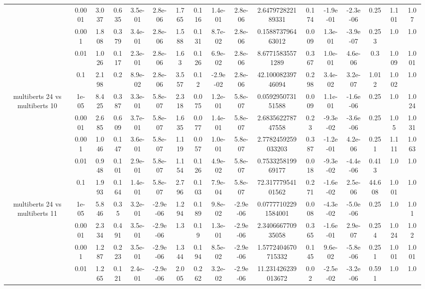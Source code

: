\begin{tabular}{|c|c|c|c|c|c|c|c|c|c|c|c|c|c|c|c|c|}
 & 0.0001 & 3.037 & 0.635 & 3.5e-01 & 2.8e-06 & 1.765 & 0.116 & 1.4e-01 & 2.8e-06 & 2.647972822189331 & 0.174 & -1.9e-01 & -2.3e-06 & 0.25 & 1.101 & 1.07 \\
 & 0.001 & 1.808 & 0.379 & 3.4e-01 & 2.8e-06 & 1.588 & 0.131 & 8.7e-02 & 2.8e-06 & 0.158873796463012 & 0.009 & 1.3e-01 & -3.9e-07 & 0.253 & 1.0 & 1.0 \\
 & 0.01 & 1.026 & 0.117 & 2.3e-01 & 2.8e-06 & 1.63 & 0.126 & 6.9e-02 & 2.8e-06 & 8.67715835571289 & 0.367 & 1.0e-01 & 4.6e-06 & 0.3 & 1.009 & 1.001 \\
 & 0.1 & 2.198 & 0.2 & 8.9e-02 & 2.8e-06 & 3.557 & 0.12 & -2.9e-02 & 2.8e-06 & 42.10008239746094 & 0.298 & 3.4e-02 & 3.2e-07 & 1.012 & 1.002 & 1.0 \\
\hline
\multirow{5}{*}{multiberts 24 vs multiberts 10} & 1e-05 & 8.425 & 0.387 & 3.3e-01 & 5.8e-07 & 2.318 & 0.075 & 1.2e-01 & 5.8e-07 & 0.059295073151588 & 0.009 & 1.1e-01 & -1.6e-06 & 0.25 & 1.0 & 1.024 \\
 & 0.0001 & 2.685 & 0.609 & 3.7e-01 & 5.8e-07 & 1.635 & 0.077 & 1.4e-01 & 5.8e-07 & 2.683562278747558 & 0.23 & -9.3e-02 & -3.6e-06 & 0.25 & 1.05 & 1.031 \\
 & 0.001 & 1.046 & 0.147 & 3.6e-01 & 5.8e-07 & 1.119 & 0.057 & 1.0e-01 & 5.8e-07 & 2.7782459259033203 & 0.387 & -1.2e-01 & 4.2e-06 & 0.251 & 1.111 & 1.063 \\
 & 0.01 & 0.948 & 0.101 & 2.9e-01 & 5.8e-07 & 1.154 & 0.126 & 4.9e-02 & 5.8e-07 & 0.753325819969177 & 0.018 & -9.3e-02 & -4.4e-06 & 0.413 & 1.0 & 1.0 \\
 & 0.1 & 1.993 & 0.164 & 1.4e-01 & 5.8e-07 & 2.796 & 0.103 & 7.9e-04 & 5.8e-07 & 72.31777954101562 & 0.271 & -1.6e-02 & 2.5e-06 & 44.608 & 1.001 & 1.0 \\
\hline
\multirow{5}{*}{multiberts 24 vs multiberts 11} & 1e-05 & 5.846 & 0.35 & 3.2e-01 & -2.9e-06 & 1.294 & 0.189 & 9.8e-02 & -2.9e-06 & 0.07777102291584001 & 0.008 & -4.3e-02 & -5.0e-06 & 0.25 & 1.0 & 1.01 \\
 & 0.0001 & 2.334 & 0.491 & 3.5e-01 & -2.9e-06 & 1.3 & 0.19 & 1.3e-01 & -2.9e-06 & 2.340666770935058 & 0.365 & -1.6e-01 & 2.9e-07 & 0.254 & 1.024 & 1.02 \\
 & 0.001 & 1.287 & 0.223 & 3.5e-01 & -2.9e-06 & 1.344 & 0.194 & 8.5e-02 & -2.9e-06 & 1.5772404670715332 & 0.145 & 9.6e-02 & -5.8e-06 & 0.251 & 1.001 & 1.001 \\
 & 0.01 & 1.265 & 0.121 & 2.4e-01 & -2.9e-06 & 2.005 & 0.262 & 3.2e-02 & -2.9e-06 & 11.231426239013672 & 0.02 & -2.5e-02 & -3.2e-06 & 0.591 & 1.0 & 1.0 \\

\end{tabular}
